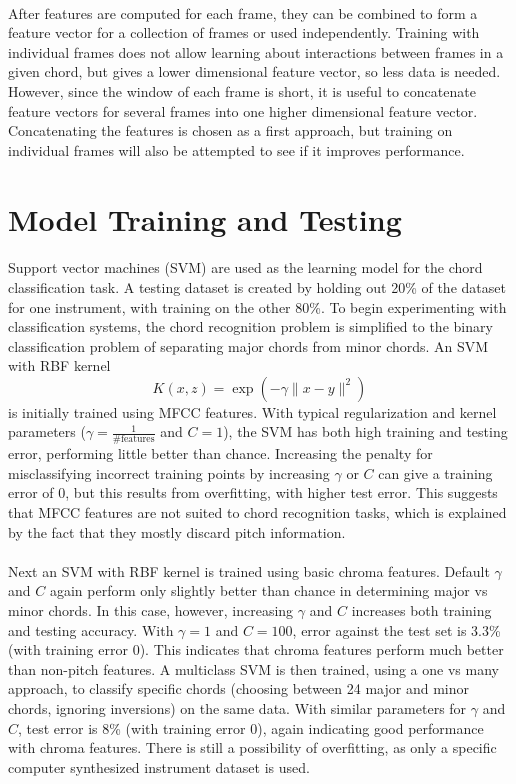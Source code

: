 \documentclass{article}
\begin{document}
\paragraph{}
After features are computed for each frame, they can be combined to form a feature vector for a collection of frames or used independently. Training with individual frames does not allow learning about interactions between
frames in a given chord, but gives a lower dimensional feature vector, so less data is needed. However, since the window of each frame is short, it is useful to concatenate feature vectors for several frames into one higher
dimensional feature vector. Concatenating the features is chosen as a first approach, but training on individual frames will also be attempted to see if it improves performance. 

\section{Model Training and Testing}
\paragraph{}
Support vector machines (SVM) are used as the learning model for the chord classification task. A testing dataset is created by holding out 20\% of the dataset for one instrument,
with training on the other 80\%. To begin experimenting with classification systems, the chord recognition problem is simplified to the binary classification problem of separating major chords from
minor chords. An SVM with RBF kernel $$ K(x, z) = \exp(-\gamma\lVert{x - y}\rVert^2)$$ is initially trained using MFCC features. With typical regularization and kernel parameters ($\gamma = \frac{1}{\text{\# features}}$ and $C = 1$), the SVM
has both high training and testing error, performing little better than chance. Increasing the penalty for misclassifying incorrect training points by increasing $\gamma$ or $C$ can give a training error of $0$, but this results
from overfitting, with higher test error. This suggests that MFCC features are not suited to chord recognition tasks, which is explained by the fact that they mostly discard pitch information.

\paragraph{}
Next an SVM with RBF kernel is trained using basic chroma features. Default $\gamma$ and $C$ again perform only slightly better than chance in determining major vs minor chords. In this case, however, increasing $\gamma$ and $C$ increases both
training and testing accuracy. With $\gamma = 1$ and $C = 100$, error against the test set is 3.3\% (with training error 0). This indicates that chroma features perform much better than non-pitch features. A multiclass SVM is then trained, using a one vs many approach, to classify specific chords (choosing between 24 major and minor chords, ignoring inversions) on the same data. With similar parameters for $\gamma$ and $C$, test error is 8\% (with training error 0), again indicating good performance with chroma
features. There is still a possibility of overfitting, as only a specific computer synthesized instrument dataset is used.
\end{document}
